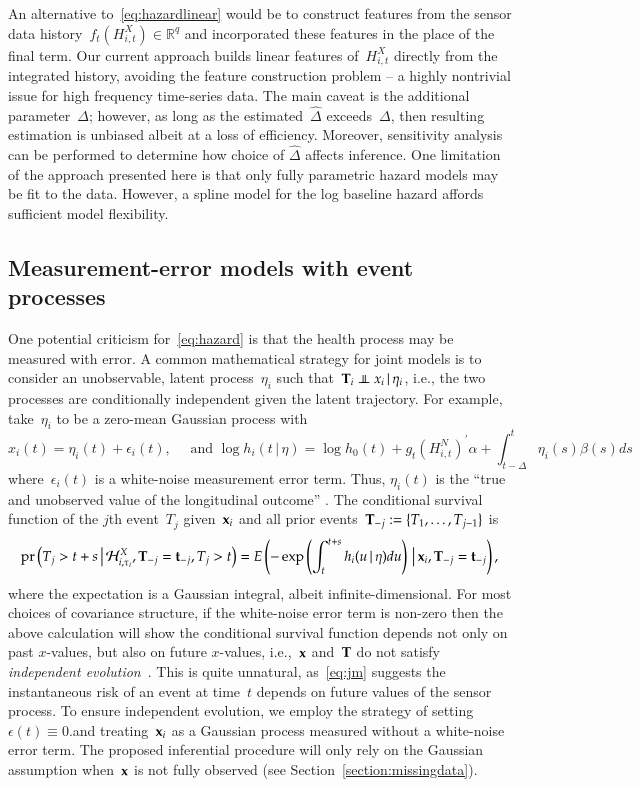 \documentclass[12pt]{amsart}
\def\pr{\mathop{\text{pr}}\nolimits}
\def\pr{\mathop{\text{pr}}\nolimits}
\def\indep{\mathrel{\rlap{$\perp$}\kern1.6pt\mathord{\perp}}}
\def\H{\mathcal{H}}
\def\given{\, | \,}
\def\Given{\, \big | \,}
\def\bft{{\bf t}}
\def\bfx{{\bf x}}
\def\bfT{{\bf T}}
\begin{document}
An alternative to~\eqref{eq:hazardlinear} would be to construct features from the sensor data history~$f_t ( H_{i,t}^{X}) \in \mathbb{R}^q$ and incorporated these features in the place of the final term. Our current approach builds linear features of~$H_{i,t}^X$ directly from the integrated history, avoiding the feature construction problem -- a highly nontrivial issue for high frequency time-series data.  The main caveat is the additional parameter~$\Delta$; however, as long as the estimated~$\hat \Delta$ exceeds~$\Delta$, then resulting estimation is unbiased albeit at a loss of efficiency.  Moreover, sensitivity analysis can be performed to determine how choice of $\hat \Delta$ affects inference.  One limitation of the approach presented here is that only fully parametric hazard models may be fit to the data. However, a spline model for the log baseline hazard affords sufficient model flexibility.

\subsection{Measurement-error models with event processes}
\label{section:memproblems}

One potential criticism for~\eqref{eq:hazard} is that the health process may be measured with error. A common mathematical strategy for joint models is to consider an unobservable, latent process~$\eta_i$ such that~$\bfT_i \indep x_i \given \eta_i$, i.e., the two processes are conditionally independent given the latent trajectory. For example, take~$\eta_i$ to be a zero-mean Gaussian process with
\begin{equation}\label{eq:jm}
x_i(t) = \eta_i (t) + \epsilon_i (t),\quad \text{ and } \log h_i (t
\given \eta ) = \log h_0 (t) + g_t \left( H_{i,t}^N \right)^{\prime}
\alpha + \int_{t-\Delta}^t \eta_i (s) \beta (s) ds
\end{equation}
where~$\epsilon_i(t)$ is a white-noise measurement error term. Thus, $\eta_i (t)$ is the ``true and unobserved value of the longitudinal outcome'' \citep[Sec. 2.1, pp.3]{Rizopoulos2010}. The conditional survival function of the $j$th event~$T_j$ given~$\bfx_i$ and all prior events~$\bfT_{-j} := \{ T_1, \ldots, T_{j-1} \}$ is
\[
\pr \left ( T_j > t+s \Given \H_{i,\tau_i}^X, \bfT_{-j} = \bft_{-j}, T_j > t \right) = E \left( - \exp \left( \int_{t}^{t+s} h_i (u \given \eta ) du \right) \Given \bfx_i, \bfT_{-j} = \bft_{-j} \right),
\]
where the expectation is a Gaussian integral, albeit infinite-dimensional.  For most choices of covariance structure, if the white-noise error term is non-zero then the above calculation will show the conditional survival function depends not only on past $x$-values, but also on future $x$-values, i.e.,~$\bfx$ and~$\bfT$ do not satisfy \emph{independent evolution}~\citep{DempseyPMCC2}. This is quite unnatural, as~\eqref{eq:jm} suggests the instantaneous risk of an event at time~$t$ depends on future values of the sensor process. To ensure independent evolution, we employ the strategy of setting~$\epsilon (t) \equiv 0$.and treating~$\bfx_i$ as a Gaussian process measured without a white-noise error term. The proposed inferential procedure will only rely on the Gaussian assumption when~$\bfx$ is not fully observed (see Section~\ref{section:missingdata}).
\end{document}
